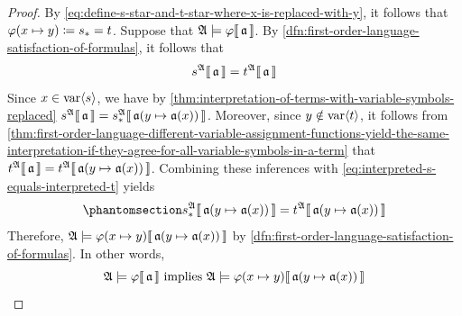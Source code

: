 \begin{proof}
    \vspace{0.1cm}
    \noindent
    By \eqref{eq:define-s-star-and-t-star-where-x-is-replaced-with-y}, it follows that \( \folfreevariablereplacement{\varphi}{x}{y} \coloneq s_{\ast} = t \).
    Suppose that \(  \mathfrak{A} \models \varphi\llbracket\, \mathfrak{a} \,\rrbracket \).
    By \cref{dfn:first-order-language-satisfaction-of-formulas}, it follows that
    \begin{equation}
        \label{eq:interpreted-s-equals-interpreted-t}
        s^{\mathfrak{A}}\llbracket\, \mathfrak{a} \,\rrbracket = t^{\mathfrak{A}}\llbracket\, \mathfrak{a} \,\rrbracket
    \end{equation}
    Since \( x \in \operatorname{var} \langle s\rangle \), we have by \cref{thm:interpretation-of-terms-with-variable-symbols-replaced}
    \( \folterminterpretation{s}{\mathfrak{A}}{\mathfrak{a}} =
    \folterminterpretation{s_{\ast}}{\mathfrak{A}}{ \folmodifiedvariableassignmentfunction{\mathfrak{a}}{y}{\mathfrak{a}(x)} } \).
    Moreover, since \( y \notin \operatorname{var} \langle t\rangle \), it follows from
    \cref{thm:first-order-language-different-variable-assignment-functions-yield-the-same-interpretation-if-they-agree-for-all-variable-symbols-in-a-term} that
    \( \folterminterpretation{t}{\mathfrak{A}}{\mathfrak{a}} =
    \folterminterpretation{t}{\mathfrak{A}}{ \folmodifiedvariableassignmentfunction{\mathfrak{a}}{y}{\mathfrak{a}(x)} } \).
    Combining these inferences with \eqref{eq:interpreted-s-equals-interpreted-t} yields
    \begin{equation}
        \phantomsection \label{eq:interpreted-s-star-equals-interpreted-t}
        \folterminterpretation{s_{\ast}}{\mathfrak{A}}{ \folmodifiedvariableassignmentfunction{\mathfrak{a}}{y}{\mathfrak{a}(x)} } =
        \folterminterpretation{t}{\mathfrak{A}}{ \folmodifiedvariableassignmentfunction{\mathfrak{a}}{y}{\mathfrak{a}(x)} }
    \end{equation}
    Therefore, \( \folwffsatisfaction{\mathfrak{A}}{ \folfreevariablereplacement{\varphi}{x}{y} }{ \folmodifiedvariableassignmentfunction{\mathfrak{a}}{y}{ \mathfrak{a}(x) } } \)
    by \cref{dfn:first-order-language-satisfaction-of-formulas}. In other words,
    \begin{equation}
        \label{eq:first-statement-forward-implication}
        \folwffsatisfaction{\mathfrak{A}}{\varphi}{\mathfrak{a}}
        \ \text{implies}
        \ \folwffsatisfaction{\mathfrak{A}}{ \folfreevariablereplacement{\varphi}{x}{y} }{ \folmodifiedvariableassignmentfunction{\mathfrak{a}}{y}{\mathfrak{a}(x)} }
    \end{equation}

\end{proof}
